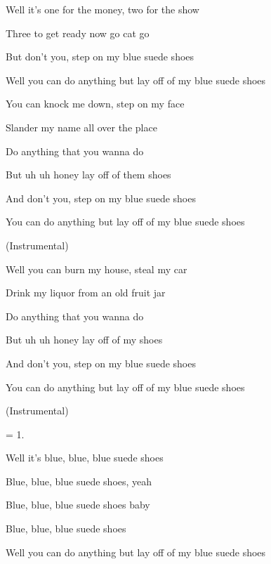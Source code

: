 
\zs
Well it's one for the money,  two for the show

Three to get ready now go cat go

But don't you, step on my blue suede shoes

Well you can do anything but lay off of my blue suede shoes
\ks

\zs
You can knock me down, step on my face

Slander my name all over the place

Do anything that you wanna do

But uh uh honey lay off of them shoes

And don't you, step on my blue suede shoes

You can do anything but lay off of my blue suede shoes
\ks

\zs
(Instrumental)
\ks

\zs
Well you can burn my house, steal my car

Drink my liquor from an old fruit jar

Do anything that you wanna do

But uh uh honey lay off of my shoes

And don't you, step on my blue suede shoes

You can do anything but lay off of my blue suede shoes
\ks

\zs
(Instrumental)
\ks

\zs
= 1.
\ks

\zs
Well it's blue, blue, blue suede shoes

Blue, blue, blue suede shoes, yeah

Blue, blue, blue suede shoes baby

Blue, blue, blue suede shoes

Well you can do anything but lay off of my blue suede shoes
\ks

\kp
